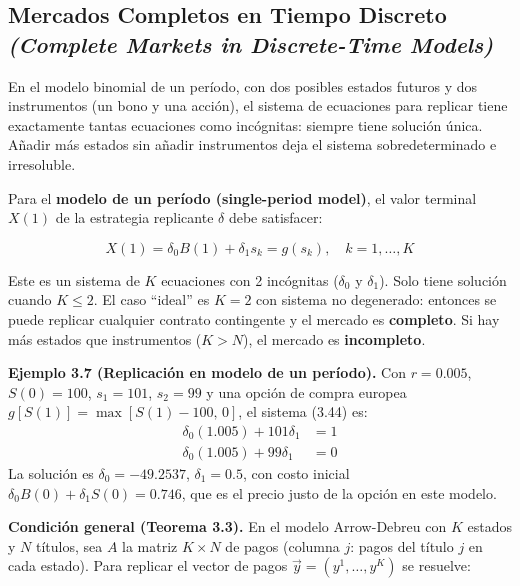 \documentclass[12pt]{article}
\begin{document}
\subsection{Mercados Completos en Tiempo Discreto\\
\textit{(Complete Markets in Discrete-Time Models)}}

\begin{intuicion}
En el modelo binomial de un per\'iodo, con dos posibles estados futuros y dos instrumentos (un bono y una acci\'on), el sistema de ecuaciones para replicar tiene exactamente tantas ecuaciones como inc\'ognitas: siempre tiene soluci\'on \'unica. A\~nadir m\'as estados sin a\~nadir instrumentos deja el sistema sobredeterminado e irresoluble.
\end{intuicion}

Para el \textbf{modelo de un per\'iodo (single-period model)}, el valor terminal $X(1)$ de la estrategia replicante $\delta$ debe satisfacer:

\begin{equation}
  X(1) = \delta_0 B(1) + \delta_1 s_k = g(s_k), \quad k = 1,\ldots,K
  \tag{3.44}
\end{equation}

\begin{intuicionmat}
Este es un sistema de $K$ ecuaciones con 2 inc\'ognitas ($\delta_0$ y $\delta_1$). Solo tiene soluci\'on cuando $K \le 2$. El caso ``ideal'' es $K=2$ con sistema no degenerado: entonces se puede replicar cualquier contrato contingente y el mercado es \textbf{completo}. Si hay m\'as estados que instrumentos ($K > N$), el mercado es \textbf{incompleto}.
\end{intuicionmat}

\textbf{Ejemplo 3.7 (Replicaci\'on en modelo de un per\'iodo).} Con $r = 0.005$, $S(0) = 100$, $s_1 = 101$, $s_2 = 99$ y una opci\'on de compra europea $g[S(1)] = \max[S(1)-100,\,0]$, el sistema (3.44) es:
\begin{align*}
  \delta_0(1.005) + 101\delta_1 &= 1 \\
  \delta_0(1.005) + 99\delta_1  &= 0
\end{align*}
La soluci\'on es $\delta_0 = -49.2537$, $\delta_1 = 0.5$, con costo inicial $\delta_0 B(0) + \delta_1 S(0) = 0.746$, que es el precio justo de la opci\'on en este modelo.

\textbf{Condici\'on general (Teorema 3.3).} En el modelo Arrow-Debreu con $K$ estados y $N$ t\'itulos, sea $A$ la matriz $K \times N$ de pagos (columna $j$: pagos del t\'itulo $j$ en cada estado). Para replicar el vector de pagos $\vec{y} = (y^1,\ldots,y^K)$ se resuelve:
\end{document}
